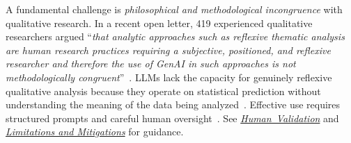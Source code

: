 \documentclass[smallextended]{svjour3}
\newcommand*{\enq}[1]{\enquote{{\itshape#1}}}
\newcommand{\humanvalidation}{\hyperref[sec:use-human-validation-for-llm-outputs]{\mbox{\emph{Human Validation}}}\xspace}
\newcommand{\limitationsmitigations}{\hyperref[sec:report-limitations-and-mitigations]{\emph{Limitations and Mitigations}}\xspace}
\newcommand{\humanvalidation}{\href{/guidelines/human-validation/}{\emph{Human Validation}}\xspace}
\newcommand{\limitationsmitigations}{\href{/guidelines/limitations/}{\emph{Limitations and Mitigations}}\xspace}
\begin{document}
A fundamental challenge is \emph{philosophical and methodological incongruence} with qualitative research. In a recent open letter, 419 experienced qualitative researchers argued \enq{that analytic approaches such as reflexive thematic analysis are human research practices requiring a subjective, positioned, and reflexive researcher and therefore the use of GenAI in such approaches is not methodologically congruent}~\cite{jowsey2025reject}. LLMs lack the capacity for genuinely reflexive qualitative analysis because they operate on statistical prediction without understanding the meaning of the data being analyzed~\cite{DBLP:journals/corr/abs-2306-13298, DBLP:journals/corr/abs-2510-18456}. Effective use requires structured prompts and careful human oversight~\cite{DBLP:conf/wsese/BarrosANKKNB25}. See \humanvalidation and \limitationsmitigations for guidance.
\end{document}
